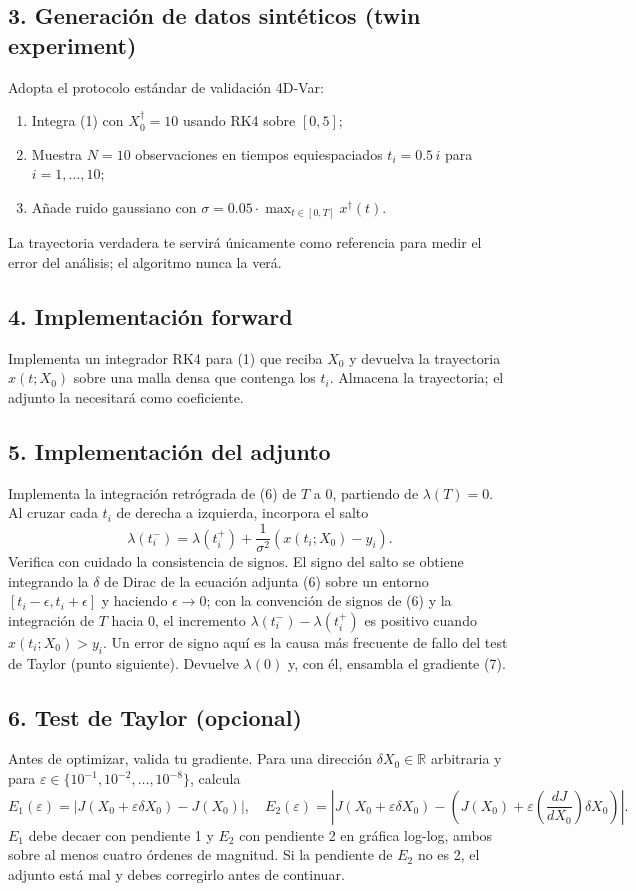 \documentclass[12pt,spanish,mexico]{article}
\numberwithin{equation}{section}
\theoremstyle{definition}
\theoremstyle{remark}
\begin{document}
\subsection{3. Generación de datos sintéticos (twin experiment)}
Adopta el protocolo estándar de validación 4D-Var:
\begin{enumerate}[label=(\alph*)]
\item Integra (1) con \(X_0^\dagger = 10\) usando RK4 sobre \([0, 5]\);
\item Muestra \(N = 10\) observaciones en tiempos equiespaciados \(t_i = 0.5\, i\) para \(i = 1, \dots, 10\);
\item Añade ruido gaussiano con \(\sigma = 0.05 \cdot \max_{t\in[0,T]} x^\dagger(t)\).
\end{enumerate}
La trayectoria verdadera te servirá únicamente como referencia para medir el error del análisis; el algoritmo nunca la verá.

\subsection{4. Implementación forward}
Implementa un integrador RK4 para (1) que reciba \(X_0\) y devuelva la trayectoria \(x(t; X_0)\) sobre una malla densa que contenga los \(t_i\). Almacena la trayectoria; el adjunto la necesitará como coeficiente.

\subsection{5. Implementación del adjunto}
Implementa la integración retrógrada de (6) de \(T\) a \(0\), partiendo de \(\lambda(T) = 0\). Al cruzar cada \(t_i\) de derecha a izquierda, incorpora el salto
\[
\lambda(t_i^-) = \lambda(t_i^+) + \frac{1}{\sigma^2}(x(t_i; X_0) - y_i).
\]
Verifica con cuidado la consistencia de signos. El signo del salto se obtiene integrando la \(\delta\) de Dirac de la ecuación adjunta (6) sobre un entorno \([t_i-\epsilon, t_i+\epsilon]\) y haciendo \(\epsilon \to 0\); con la convención de signos de (6) y la integración de \(T\) hacia \(0\), el incremento \(\lambda(t_i^-) - \lambda(t_i^+)\) es positivo cuando \(x(t_i; X_0) > y_i\). Un error de signo aquí es la causa más frecuente de fallo del test de Taylor (punto siguiente). Devuelve \(\lambda(0)\) y, con él, ensambla el gradiente (7).

\subsection{6. Test de Taylor (opcional)}
Antes de optimizar, valida tu gradiente. Para una dirección \(\delta X_0 \in \mathbb{R}\) arbitraria y para \(\varepsilon \in \{10^{-1}, 10^{-2}, \dots, 10^{-8}\}\), calcula
\[
E_1(\varepsilon) = |J(X_0 + \varepsilon \delta X_0) - J(X_0)|, \quad E_2(\varepsilon) = |J(X_0 + \varepsilon \delta X_0) - (J(X_0) + \varepsilon \left(\frac{dJ}{dX_0}\right) \delta X_0)|.
\]
\(E_1\) debe decaer con pendiente 1 y \(E_2\) con pendiente 2 en gráfica log-log, ambos sobre al menos cuatro órdenes de magnitud. Si la pendiente de \(E_2\) no es 2, el adjunto está mal y debes corregirlo antes de continuar.
\end{document}
